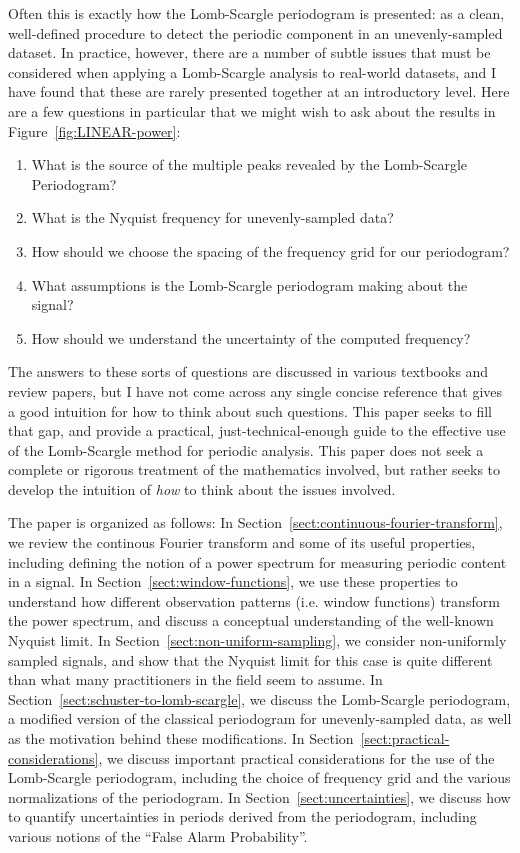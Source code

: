 \documentclass[preprint]{aastex}
\newcommand{\fig}[1]{Figure~\ref{fig:#1}}
\newcommand{\Sect}[1]{Section~\ref{sect:#1}}
\newcommand{\sect}[1]{\Sect{#1}}
\begin{document}
Often this is exactly how the Lomb-Scargle periodogram is presented: as a clean, well-defined procedure to detect the periodic component in an unevenly-sampled dataset.
In practice, however, there are a number of subtle issues that must be considered when applying a Lomb-Scargle analysis to real-world datasets, and I have found that these are rarely presented together at an introductory level.
Here are a few questions in particular that we might wish to ask about the results in \fig{LINEAR-power}:
\begin{enumerate}
  \item What is the source of the multiple peaks revealed by the Lomb-Scargle Periodogram?
  \item What is the Nyquist frequency for unevenly-sampled data?
  \item How should we choose the spacing of the frequency grid for our periodogram?
  \item What assumptions is the Lomb-Scargle periodogram making about the signal?
  \item How should we understand the uncertainty of the computed frequency?
\end{enumerate}
The answers to these sorts of questions are discussed in various textbooks and review papers, but I have not come across any single concise reference that gives a good intuition for how to think about such questions.
This paper seeks to fill that gap, and provide a practical, just-technical-enough guide to the effective use of the Lomb-Scargle method for periodic analysis.
This paper does not seek a complete or rigorous treatment of the mathematics involved, but rather seeks to develop the intuition of {\it how} to think about the issues involved.

The paper is organized as follows:
In \sect{continuous-fourier-transform}, we review the continous Fourier
transform and some of its useful properties, including defining the notion of
a power spectrum for measuring periodic content in a signal.
In \sect{window-functions}, we use these properties to understand how different
observation patterns (i.e. window functions) transform the power spectrum, and
discuss a conceptual understanding of the well-known Nyquist limit.
In \sect{non-uniform-sampling}, we consider non-uniformly sampled signals, and
show that the Nyquist limit for this case is quite different than what many
practitioners in the field seem to assume.
In \sect{schuster-to-lomb-scargle}, we discuss the Lomb-Scargle periodogram, a
modified version of the classical periodogram for unevenly-sampled data, as
well as the motivation behind these modifications.
In \sect{practical-considerations}, we discuss important practical
considerations for the use of the Lomb-Scargle periodogram, including
the choice of frequency grid and the various normalizations of the periodogram.
In \sect{uncertainties}, we discuss how to quantify uncertainties in periods
derived from the periodogram, including various notions of the
``False Alarm Probability''.
\end{document}

